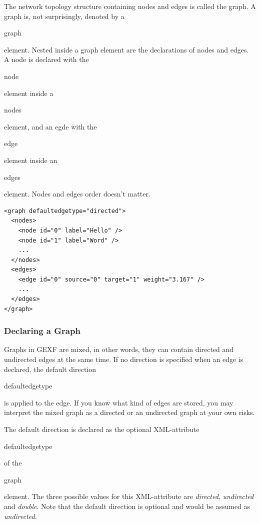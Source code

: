 \documentclass[a4paper,10pt]{article}
\begin{document}
The network topology structure containing nodes and edges is called the graph. A graph is, not surprisingly, denoted by a \begin{footnotesize}graph\end{footnotesize} element. Nested inside a graph element are the declarations of nodes and edges. A node is declared with the \begin{footnotesize}node\end{footnotesize} element inside a \begin{footnotesize}nodes\end{footnotesize} element, and an egde with the \begin{footnotesize}edge\end{footnotesize} element inside an \begin{footnotesize}edges\end{footnotesize} element. Nodes and edges order doesn't matter.

\lstset{ style=gexf }
\begin{lstlisting}[caption={The definition of the graph},label=topology]
<graph defaultedgetype="directed">
  <nodes>
    <node id="0" label="Hello" />
    <node id="1" label="Word" />
    ...
  </nodes>
  <edges>
    <edge id="0" source="0" target="1" weight="3.167" />
    ...
  </edges>
</graph>
\end{lstlisting}

\subsubsection{Declaring a Graph}

Graphs in GEXF are mixed, in other words, they can contain directed and undirected edges at the same time. If no direction is specified when an edge is declared, the default direction \begin{footnotesize}defaultedgetype\end{footnotesize} is applied to the edge. If you know what kind of edges are stored, you may interpret the mixed graph as a directed or an undirected graph at your own risks.

The default direction is declared as the optional XML-attribute \begin{footnotesize}defaultedgetype\end{footnotesize} of the \begin{footnotesize}graph\end{footnotesize} element. The three possible values for this XML-attribute are \textit{directed}, \textit{undirected} and \textit{double}. Note that the default direction is optional and would be assumed as \textit{undirected}.
\end{document}
